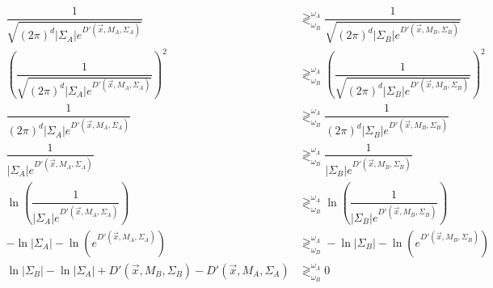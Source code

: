 \documentclass{article}
\begin{document}
\begin{align*}
  \dfrac{1}{\sqrt{(2\pi)^d |\Sigma_A| e^{D'(\vec{x},M_A,\Sigma_A)}}} 
  &\gtrless^{\omega_A}_{\omega_B}
  \dfrac{1}{\sqrt{(2\pi)^d |\Sigma_B| e^{D'(\vec{x},M_B,\Sigma_B)}}} \\
  \left(\dfrac{1}{\sqrt{(2\pi)^d |\Sigma_A| e^{D'(\vec{x},M_A,\Sigma_A)}}}\right)^2
  &\gtrless^{\omega_A}_{\omega_B}
  \left(\dfrac{1}{\sqrt{(2\pi)^d |\Sigma_B| e^{D'(\vec{x},M_B,\Sigma_B)}}}\right)^2 \\
  \dfrac{1}{(2\pi)^d |\Sigma_A| e^{D'(\vec{x},M_A,\Sigma_A)}}
  &\gtrless^{\omega_A}_{\omega_B}
  \dfrac{1}{(2\pi)^d |\Sigma_B| e^{D'(\vec{x},M_B,\Sigma_B)}} \\
  \dfrac{1}{|\Sigma_A| e^{D'(\vec{x},M_A,\Sigma_A)}}
  &\gtrless^{\omega_A}_{\omega_B}
  \dfrac{1}{|\Sigma_B| e^{D'(\vec{x},M_B,\Sigma_B)}} \\
  \ln\left(\dfrac{1}{|\Sigma_A| e^{D'(\vec{x},M_A,\Sigma_A)}}\right)
  &\gtrless^{\omega_A}_{\omega_B}
  \ln\left(\dfrac{1}{|\Sigma_B| e^{D'(\vec{x},M_B,\Sigma_B)}}\right) \\
  -\ln|\Sigma_A| - \ln(e^{D'(\vec{x},M_A,\Sigma_A)})
  &\gtrless^{\omega_A}_{\omega_B}
  -\ln|\Sigma_B| - \ln(e^{D'(\vec{x},M_B,\Sigma_B)}) \\
  \ln|\Sigma_B| - \ln|\Sigma_A| +
  D'(\vec{x},M_B,\Sigma_B) - D'(\vec{x},M_A,\Sigma_A)
  &\gtrless^{\omega_A}_{\omega_B}
  0
\end{align*}


\end{document}
